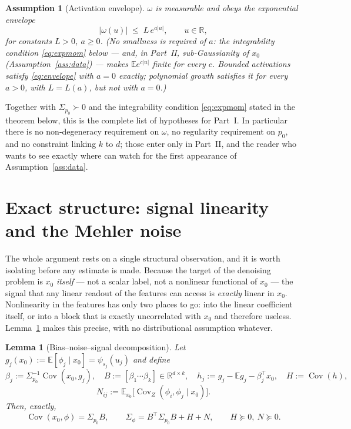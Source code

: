 \documentclass[11pt]{article}
\newtheorem{lemma}{Lemma}
\newtheorem{assumption}{Assumption}
\theoremstyle{remark}
\newcommand{\E}{\mathbb{E}}
\newcommand{\R}{\mathbb{R}}
\newcommand{\Cov}{\operatorname{Cov}}
\newcommand{\Sig}{\Sigma_{p_0}}
\begin{document}
\begin{assumption}[Activation envelope]\label{ass:env}
$\omega$ is measurable and obeys the exponential envelope
\begin{equation}\label{eq:envelope}
|\omega(u)| \;\le\; L\,e^{a|u|}, \qquad u \in \R,
\end{equation}
for constants $L > 0$, $a \ge 0$. (No smallness is required of $a$: the integrability condition \eqref{eq:expmom} below --- and, in Part~II, sub-Gaussianity of $x_0$ (Assumption~\ref{ass:data}) --- makes $\E e^{c|u|}$ finite for every $c$. Bounded activations satisfy \eqref{eq:envelope} with $a = 0$ exactly; polynomial growth satisfies it for \emph{every} $a > 0$, with $L = L(a)$, but not with $a = 0$.)
\end{assumption}

\noindent Together with $\Sig \succ 0$ and the integrability condition \eqref{eq:expmom} stated in the theorem below, this is the complete list of hypotheses for Part~I. In particular there is no non-degeneracy requirement on $\omega$, no regularity requirement on $p_0$, and no constraint linking $k$ to $d$; those enter only in Part~II, and the reader who wants to see exactly where can watch for the first appearance of Assumption~\ref{ass:data}.

\section{Exact structure: signal linearity and the Mehler noise}\label{sec:exact}

The whole argument rests on a single structural observation, and it is worth isolating before any estimate is made. Because the target of the denoising problem is $x_0$ \emph{itself} --- not a scalar label, not a nonlinear functional of $x_0$ --- the signal that any linear readout of the features can access is \emph{exactly} linear in $x_0$. Nonlinearity in the features has only two places to go: into the linear coefficient itself, or into a block that is exactly uncorrelated with $x_0$ and therefore useless. Lemma~\ref{lem:decomp} makes this precise, with no distributional assumption whatever.

\begin{lemma}[Bias--noise--signal decomposition]\label{lem:decomp}
Let $g_j(x_0) := \E[\phi_j \mid x_0] = \psi_{s_j}(u_j)$ and define
\[
\beta_j := \Sig^{-1}\Cov(x_0, g_j), \quad B := [\beta_1 \cdots \beta_k] \in \R^{d\times k}, \quad
h_j := g_j - \E g_j - \beta_j^\top x_0, \quad H := \Cov(h),
\]
\[
N_{ij} := \E_{x_0}\big[\Cov_Z(\phi_i, \phi_j \mid x_0)\big].
\]
Then, exactly,
\[
\Cov(x_0, \phi) = \Sig B, \qquad \Sigma_\phi = B^\top \Sig B + H + N, \qquad H \succeq 0,\ N \succeq 0 .
\]
\end{lemma}
\end{document}
